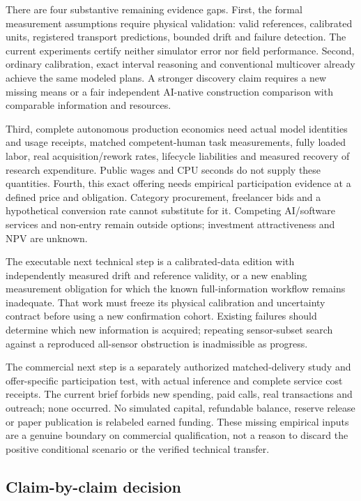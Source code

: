 \documentclass[
  11pt,
]{article}
\begin{document}
There are four substantive remaining evidence gaps. First, the formal
measurement assumptions require physical validation: valid references,
calibrated units, registered transport predictions, bounded drift and
failure detection. The current experiments certify neither simulator
error nor field performance. Second, ordinary calibration, exact
interval reasoning and conventional multicover already achieve the same
modeled plans. A stronger discovery claim requires a new missing means
or a fair independent AI-native construction comparison with comparable
information and resources.

Third, complete autonomous production economics need actual model
identities and usage receipts, matched competent-human task
measurements, fully loaded labor, real acquisition/rework rates,
lifecycle liabilities and measured recovery of research expenditure.
Public wages and CPU seconds do not supply these quantities. Fourth,
this exact offering needs empirical participation evidence at a defined
price and obligation. Category procurement, freelancer bids and a
hypothetical conversion rate cannot substitute for it. Competing
AI/software services and non-entry remain outside options; investment
attractiveness and NPV are unknown.

The executable next technical step is a calibrated-data edition with
independently measured drift and reference validity, or a new enabling
measurement obligation for which the known full-information workflow
remains inadequate. That work must freeze its physical calibration and
uncertainty contract before using a new confirmation cohort. Existing
failures should determine which new information is acquired; repeating
sensor-subset search against a reproduced all-sensor obstruction is
inadmissible as progress.

The commercial next step is a separately authorized matched-delivery
study and offer-specific participation test, with actual inference and
complete service cost receipts. The current brief forbids new spending,
paid calls, real transactions and outreach; none occurred. No simulated
capital, refundable balance, reserve release or paper publication is
relabeled earned funding. These missing empirical inputs are a genuine
boundary on commercial qualification, not a reason to discard the
positive conditional scenario or the verified technical transfer.

\hypertarget{claim-by-claim-decision}{%
\subsection{Claim-by-claim decision}\label{claim-by-claim-decision}}
\end{document}
